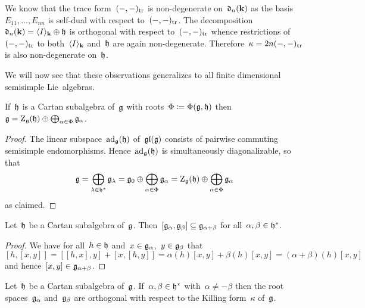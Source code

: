 \begin{example}
\begin{enumerate}
      We know that the trace form~$(-,-)_{\operatorname{tr}}$ is non-degenerate on~$\mathfrak{d}_n(\mathbf{k})$ as the basis~$E_{11}, \dotsc, E_{nn}$ is self-dual with respect to~$(-,-)_{\operatorname{tr}}$.
      The decomposition~$\mathfrak{d}_n(\mathbf{k}) = \langle I\rangle_{\mathbf{k}} \oplus \mathfrak{h}$ is orthogonal with respect to~$(-,-)_{\operatorname{tr}}$ whence restrictions of~$(-,-)_{\operatorname{tr}}$ to both~$\langle I\rangle_{\mathbf{k}}$ and~$\mathfrak{h}$ are again non-degenerate.
      Therefore~$\kappa = 2n (-,-)_{\operatorname{tr}}$ is also non-degenerate on~$\mathfrak{h}$.
  \end{enumerate}
  We will now see that these observations generalizes to all finite dimensional semisimple Lie~algebras.
\end{example}


\begin{lemma}
  \label{pre root space decomposition}
  If~$\mathfrak{h}$ is a Cartan subalgebra of~$\mathfrak{g}$ with roots~$\Phi \coloneqq \Phi(\mathfrak{g}, \mathfrak{h})$ then~$\mathfrak{g} = \operatorname{Z}_{\mathfrak{g}}(\mathfrak{h}) \oplus \bigoplus_{\alpha \in \Phi} \mathfrak{g}_\alpha$.
\end{lemma}


\begin{proof}
  The linear subspace~$\operatorname{ad}_{\mathfrak{g}}(\mathfrak{h})$ of~$\mathfrak{gl}(\mathfrak{g})$ consists of pairwise commuting semisimple endomorphisms.
  Hence~$\operatorname{ad}_{\mathfrak{g}}(\mathfrak{h})$ is simultaneously diagonalizable, so that
  \[
    \mathfrak{g}
    =
    \bigoplus_{\lambda \in \mathfrak{h}^*} \mathfrak{g}_\lambda
    =
    \mathfrak{g}_0
    \oplus
    \bigoplus_{\alpha \in \Phi} \mathfrak{g}_\alpha
    =
    \operatorname{Z}_{\mathfrak{g}}(\mathfrak{h})
    \oplus
    \bigoplus_{\alpha \in \Phi} \mathfrak{g}_\alpha
  \]
  as claimed.
\end{proof}


\begin{lemma}
  Let~$\mathfrak{h}$ be a Cartan subalgebra of~$\mathfrak{g}$.
  Then~$[\mathfrak{g}_\alpha, \mathfrak{g}_\beta] \subseteq \mathfrak{g}_{\alpha+\beta}$ for all~$\alpha, \beta \in \mathfrak{h}^*$.
\end{lemma}


\begin{proof}
  We have for all~$h \in \mathfrak{h}$ and~$x \in \mathfrak{g}_\alpha$,~$y \in \mathfrak{g}_\beta$ that
  \[
    [h,[x,y]]
    =
    [[h,x],y] + [x,[h,y]]
    =
    \alpha(h)[x,y] + \beta(h)[x,y]
    =
    (\alpha+\beta)(h) [x,y]
  \]
  and hence~$[x,y] \in \mathfrak{g}_{\alpha+\beta}$.
\end{proof}


\begin{lemma}
  \label{root spaces orthogonal with respect to killing form}
  Let~$\mathfrak{h}$ be a Cartan subalgebra of~$\mathfrak{g}$.
  If~$\alpha, \beta \in \mathfrak{h}^*$ with~$\alpha \neq -\beta$ then the root spaces~$\mathfrak{g}_\alpha$ and~$\mathfrak{g}_\beta$ are orthogonal with respect to the Killing form~$\kappa$ of~$\mathfrak{g}$.
\end{lemma}


